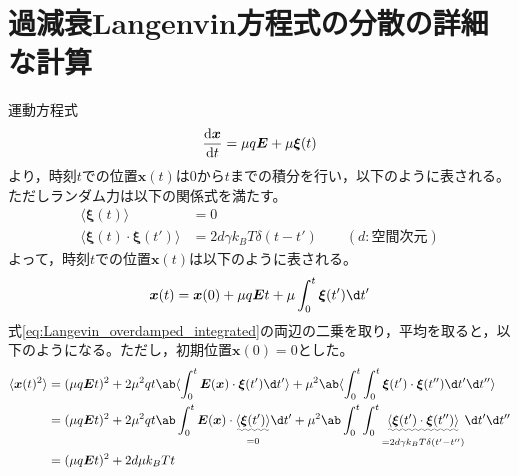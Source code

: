 \documentclass[autodetect-engine,dvi=dvipdfmx,a4paper,ja=standard,oneside,openany,11pt,draft]{bxjsbook}
\begin{document}
\section{過減衰Langenvin方程式の分散の詳細な計算}
運動方程式
\begin{equation}
  \odv{\bm{x}}{t}=\mu q\bm{E}+\mu\bm{\xi}(t)
  \label{eq:Langevin_overdamped}
\end{equation}
より，時刻$t$での位置$\bm{x}(t)$は0から$t$までの積分を行い，以下のように表される。ただしランダム力は以下の関係式を満たす。
\begin{equation}
  \begin{split}
    \langle\bm{\xi}(t)\rangle                  & =0                                                   \\
    \langle\bm{\xi}(t)\cdot\bm{\xi}(t')\rangle & =2d\gamma k_B T\delta(t-t') \qquad (d:\mathrm{空間次元})
  \end{split}
  \label{eq:random_force}
\end{equation}
よって，時刻$t$での位置$\bm{x}(t)$は以下のように表される。
\begin{equation}
  \bm{x}(t)=\bm{x}(0)+\mu q\bm{E}t+\mu\int_0^t\bm{\xi}(t')\d t'
  \label{eq:Langevin_overdamped_integrated}
\end{equation}
式\ref{eq:Langevin_overdamped_integrated}の両辺の二乗を取り，平均を取ると，以下のようになる。ただし，初期位置$\bm{x}(0)=0$とした。
\begin{equation}
  \begin{split}
    \langle\bm{x}(t)^2\rangle & =(\mu q \bm{E} t)^2+2\mu^2 q t\ab\langle\int_{0}^{t}\bm{E}(\bm{x})\cdot\bm{\xi}(t') \d t'\rangle+\mu^2\ab\langle\int_{0}^{t}\int_{0}^{t}\bm{\xi}(t')\cdot
    \bm{\xi}(t'') \d t' \d t''\rangle                                                                                                                                                                                                                            \\
                              & =(\mu q \bm{E} t)^2+2\mu^2 q t\ab\int_{0}^{t}\bm{E}(\bm{x})\cdot\underset{=0}{\uwave{\langle\bm{\xi}(t')\rangle}} \d t'+\mu^2\ab\int_{0}^{t}\int_{0}^{t}\underset{=2d\gamma k_B T\delta(t'-t'')}{\uwave{\langle\bm{\xi}(t')\cdot
    \bm{\xi}(t'')\rangle}} \d t' \d t''                                                                                                                                                                                                                          \\
                              & =(\mu q \bm{E} t)^2+2d\mu k_B T t                                                                                                                                                                                                \\
  \end{split}
  \label{eq:Langevin_overdamped_average}
\end{equation}
\end{document}
